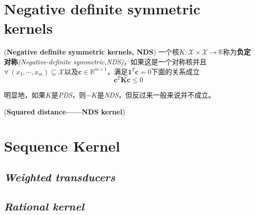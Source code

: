 \section{Negative definite symmetric kernels}

\begin{define}
    (\textbf{Negative definite symmetric kernels, NDS}) 一个核$K:\mathcal{X}\times \mathcal{X}\rightarrow \mathbb{R}$称为\textbf{负定对称}\textsl{(Negative-definite symmetric,NDS)}，如果这是一个对称核并且$\forall\ (x_1,\cdots,x_m)\subseteq \mathcal{X}$以及$\mathbf{c}\in \mathbb{R}^{m\times 1}$，满足$\mathbf{1}^T\mathbf{c}=0$下面的关系成立
    \begin{equation}
        \mathbf{c}^T\mathbf{K}\mathbf{c}\leqslant 0
    \end{equation}
\end{define}

明显地，如果$K$是\textsl{PDS}，则$-K$是\textsl{NDS}，但反过来一般来说并不成立。

\begin{example}
    (\textbf{Squared distance——NDS kernel})\hspace{0.5em} 
\end{example}

\section{Sequence Kernel}

\subsection*{\textsl{Weighted transducers}}

\subsection*{\textsl{Rational kernel}}